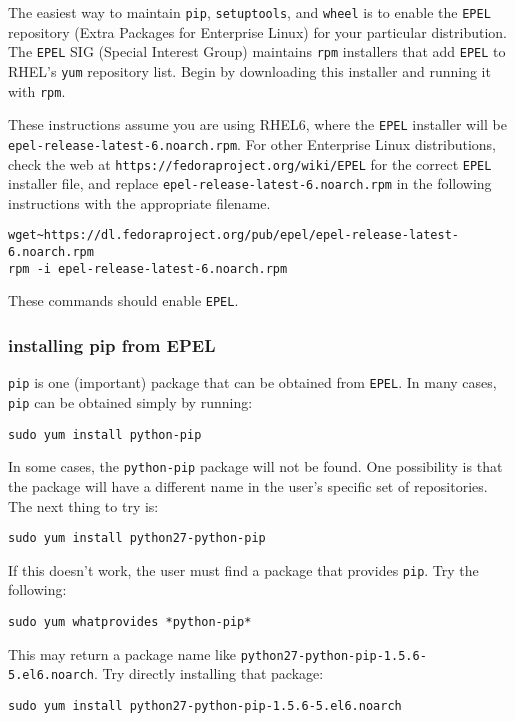 The easiest way to maintain \verb|pip|, \verb|setuptools|, and \verb|wheel|
is to enable the \verb|EPEL| repository (Extra Packages for Enterprise Linux)
for your particular distribution.
The \verb|EPEL| SIG (Special Interest Group) 
maintains \verb|rpm| installers that add \verb|EPEL| 
to RHEL's \verb|yum| repository list.
Begin by downloading this installer
and running it with \verb|rpm|.

These instructions assume you are using RHEL6,
where the \verb|EPEL| installer will be 
\verb|epel-release-latest-6.noarch.rpm|.
For other Enterprise Linux distributions,
check the web at \verb|https://fedoraproject.org/wiki/EPEL|
for the correct \verb|EPEL| installer file,
and replace \verb|epel-release-latest-6.noarch.rpm|
in the following instructions with the appropriate filename.
\begin{lstlisting}
wget~https://dl.fedoraproject.org/pub/epel/epel-release-latest-6.noarch.rpm
rpm -i epel-release-latest-6.noarch.rpm  
\end{lstlisting}
These commands should enable \verb|EPEL|.


\subsubsection{installing pip from EPEL}
\label{subsubsec:pip_from_epel}

\verb|pip| is one (important) package that can be obtained from \verb|EPEL|.
In many cases, \verb|pip| can be obtained simply by running:
\begin{lstlisting}
sudo yum install python-pip
\end{lstlisting}
In some cases, the \verb|python-pip| package will not be found.
One possibility is that the package will have a different name
in the user's specific set of repositories.
The next thing to try is:
\begin{lstlisting}
sudo yum install python27-python-pip
\end{lstlisting}
If this doesn't work, 
the user must find a package that provides \verb|pip|.
Try the following:
\begin{lstlisting}
sudo yum whatprovides *python-pip*
\end{lstlisting}
This may return a package name like \newline 
\verb|python27-python-pip-1.5.6-5.el6.noarch|.
Try directly installing that package:
\begin{lstlisting}
sudo yum install python27-python-pip-1.5.6-5.el6.noarch
\end{lstlisting}

